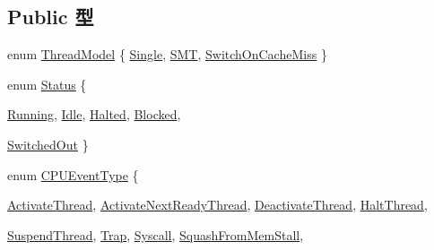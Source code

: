\subsection*{Public 型}
\begin{DoxyCompactItemize}
\item 
enum \hyperlink{classInOrderCPU_a27fc31cad7f14b3f31546056efddeaf1}{ThreadModel} \{ \hyperlink{classInOrderCPU_a27fc31cad7f14b3f31546056efddeaf1a68168ddfb80052045df470955d649258}{Single}, 
\hyperlink{classInOrderCPU_a27fc31cad7f14b3f31546056efddeaf1ad7ecd51555a027dd07c2d14f123bfe6c}{SMT}, 
\hyperlink{classInOrderCPU_a27fc31cad7f14b3f31546056efddeaf1af15b471f97b68795dc1ed6ca9cac5ebc}{SwitchOnCacheMiss}
 \}
\item 
enum \hyperlink{classInOrderCPU_a67a0db04d321a74b7e7fcfd3f1a3f70b}{Status} \{ \par
\hyperlink{classInOrderCPU_a67a0db04d321a74b7e7fcfd3f1a3f70ba2f5f2c4a8c4f4f0519d503dcdfbf55cb}{Running}, 
\hyperlink{classInOrderCPU_a67a0db04d321a74b7e7fcfd3f1a3f70bad3fa9ae9431d6cb1772f9d9df48cab19}{Idle}, 
\hyperlink{classInOrderCPU_a67a0db04d321a74b7e7fcfd3f1a3f70ba185a75df63e845aec97632afd6a34d6a}{Halted}, 
\hyperlink{classInOrderCPU_a67a0db04d321a74b7e7fcfd3f1a3f70ba9463ee9b8700258a1019b4b9d2d77a30}{Blocked}, 
\par
\hyperlink{classInOrderCPU_a67a0db04d321a74b7e7fcfd3f1a3f70ba2c25b24188e2b53c8706769167a82779}{SwitchedOut}
 \}
\item 
enum \hyperlink{classInOrderCPU_aedc081b7a3ef1b1568e62dec4a64c1ca}{CPUEventType} \{ \par
\hyperlink{classInOrderCPU_aedc081b7a3ef1b1568e62dec4a64c1caa391f5669603c83ae987a98aa7e9603bf}{ActivateThread}, 
\hyperlink{classInOrderCPU_aedc081b7a3ef1b1568e62dec4a64c1caad15fbcf08bb36f7edd64f89e13d76616}{ActivateNextReadyThread}, 
\hyperlink{classInOrderCPU_aedc081b7a3ef1b1568e62dec4a64c1caad1ab56a875437119606fffcc25bbd970}{DeactivateThread}, 
\hyperlink{classInOrderCPU_aedc081b7a3ef1b1568e62dec4a64c1caafc4cce6b04821394a15b6531b958f6cc}{HaltThread}, 
\par
\hyperlink{classInOrderCPU_aedc081b7a3ef1b1568e62dec4a64c1caac6f9fd02f217ce213280d2e09642e832}{SuspendThread}, 
\hyperlink{classInOrderCPU_aedc081b7a3ef1b1568e62dec4a64c1caa178e499decd0c21272bc34e4b3056eab}{Trap}, 
\hyperlink{classInOrderCPU_aedc081b7a3ef1b1568e62dec4a64c1caad2145e5e5c075863737dcea0a2060622}{Syscall}, 
\hyperlink{classInOrderCPU_aedc081b7a3ef1b1568e62dec4a64c1caa1c9193ea2061c0841070f8d302f87220}{SquashFromMemStall}, 
\par

\end{DoxyCompactItemize}
